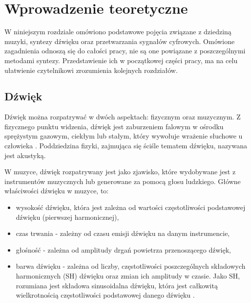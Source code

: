 \chapter{Wprowadzenie teoretyczne}\label{chapter2}

W niniejszym rozdziale omówiono podstawowe pojęcia związane z dziedziną muzyki, syntezy dźwięku oraz przetwarzania sygnałów cyfrowych. Omówione zagadnienia odnoszą się do całości pracy, nie są one powiązane z poszczególnymi metodami syntezy. Przedstawienie ich w początkowej części pracy, ma na celu ułatwienie czytelnikowi zrozumienia kolejnych rozdziałów.



\section{Dźwięk}
Dźwięk można rozpatrywać w dwóch aspektach: fizycznym oraz muzycznym. Z fizycznego punktu widzenia, dźwięk jest zaburzeniem falowym w ośrodku sprężystym gazowym, ciekłym lub stałym, który wywołuje wrażenie słuchowe u człowieka \cite{dzwiek_pwn}. Poddziedzina fizyki, zajmująca się ściśle tematem dźwięku, nazywana jest akustyką.

W muzyce, dźwięk rozpatrywany jest jako zjawisko, które wydobywane jest z instrumentów muzycznych lub generowane za pomocą głosu ludzkiego. Główne właściwości dźwięku w muzyce, to:

\begin{itemize}
	\item wysokość dźwięku, która jest zależna od wartości częstotliwości podstawowej dźwięku (pierwszej harmonicznej),
	
	\item czas trwania - zależny od czasu emisji dźwięku na danym instrumencie,
	
	\item głośność - zależna od amplitudy drgań powietrza przenoszącego dźwięk,
	
	\item barwa dźwięku - zależna od liczby, częstotliwości poszczególnych składowych harmonicznych (SH) dźwięku oraz zmian ich amplitudy w czasie. Jako SH, rozumiana jest składowa sinusoidalna dźwięku, która jest całkowitą wielkrotnością częstotliwości podstawowej danego dźwięku \cite{synth_brief_intro}.
\end{itemize}

